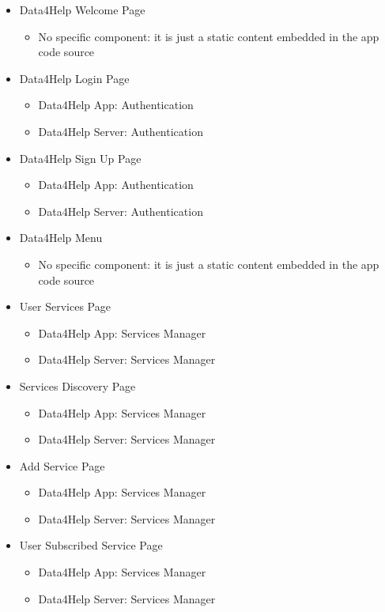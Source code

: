 \documentclass[../DD.tex]{subfiles}
\begin{document}
	\begin{itemize}
		\item Data4Help Welcome Page
			\begin{itemize}\item{No specific component: it is just a static content embedded in the app code source}\end{itemize}
		\item Data4Help Login Page
			\begin{itemize}\item{Data4Help App: Authentication}\item{Data4Help Server: Authentication}\end{itemize}
		\item Data4Help Sign Up Page
			\begin{itemize}\item{Data4Help App: Authentication}\item{Data4Help Server: Authentication}\end{itemize}
		\item Data4Help Menu
			\begin{itemize}\item{No specific component: it is just a static content embedded in the app code source}\end{itemize}
		\item User Services Page	
			\begin{itemize}\item{Data4Help App: Services Manager} \item{Data4Help Server: Services Manager}\end{itemize}	
		\item Services Discovery Page			
			\begin{itemize}\item{Data4Help App: Services Manager} \item{Data4Help Server: Services Manager}\end{itemize}	
		\item Add Service Page
			\begin{itemize}\item{Data4Help App: Services Manager} \item{Data4Help Server: Services Manager}\end{itemize}
		\item User Subscribed Service Page
			\begin{itemize}\item{Data4Help App: Services Manager} \item{Data4Help Server: Services Manager}\end{itemize}

\end{itemize}
\end{document}
